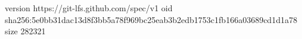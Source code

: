 version https://git-lfs.github.com/spec/v1
oid sha256:5e0bb31dac13d8f3bb5a78f969bc25eab3b2edb1753c1fb166a03689cd1d1a78
size 282321
